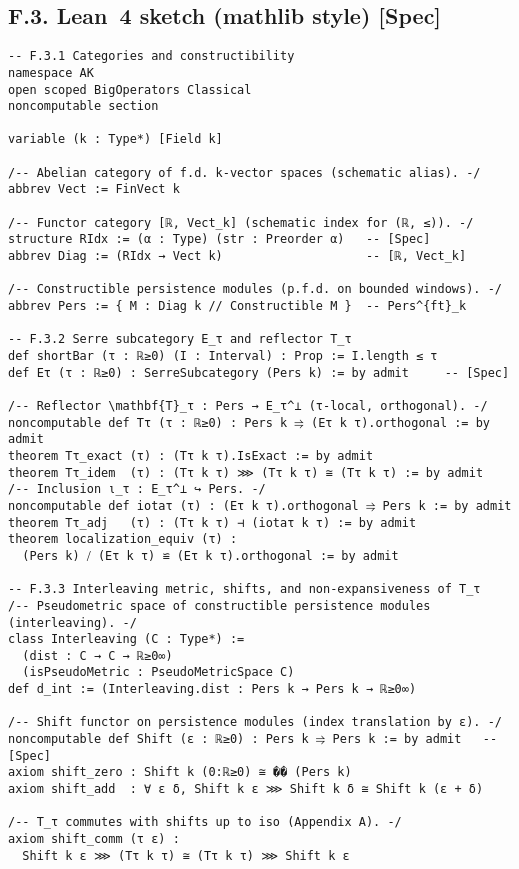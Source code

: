 \documentclass[11pt]{article}
\numberwithin{equation}{section}
\theoremstyle{definition}
\begin{document}
\subsection*{F.3. Lean~4 sketch (\textsf{mathlib} style) [Spec]}
\begin{verbatim}
-- F.3.1 Categories and constructibility
namespace AK
open scoped BigOperators Classical
noncomputable section

variable (k : Type*) [Field k]

/-- Abelian category of f.d. k-vector spaces (schematic alias). -/
abbrev Vect := FinVect k

/-- Functor category [ℝ, Vect_k] (schematic index for (ℝ, ≤)). -/
structure RIdx := (α : Type) (str : Preorder α)   -- [Spec]
abbrev Diag := (RIdx → Vect k)                    -- [ℝ, Vect_k]

/-- Constructible persistence modules (p.f.d. on bounded windows). -/
abbrev Pers := { M : Diag k // Constructible M }  -- Pers^{ft}_k

-- F.3.2 Serre subcategory E_τ and reflector T_τ
def shortBar (τ : ℝ≥0) (I : Interval) : Prop := I.length ≤ τ
def Eτ (τ : ℝ≥0) : SerreSubcategory (Pers k) := by admit     -- [Spec]

/-- Reflector \mathbf{T}_τ : Pers → E_τ^⊥ (τ-local, orthogonal). -/
noncomputable def Tτ (τ : ℝ≥0) : Pers k ⥤ (Eτ k τ).orthogonal := by admit
theorem Tτ_exact (τ) : (Tτ k τ).IsExact := by admit
theorem Tτ_idem  (τ) : (Tτ k τ) ⋙ (Tτ k τ) ≅ (Tτ k τ) := by admit
/-- Inclusion ι_τ : E_τ^⊥ ↪ Pers. -/
noncomputable def iotaτ (τ) : (Eτ k τ).orthogonal ⥤ Pers k := by admit
theorem Tτ_adj   (τ) : (Tτ k τ) ⊣ (iotaτ k τ) := by admit
theorem localization_equiv (τ) :
  (Pers k) ⧸ (Eτ k τ) ≌ (Eτ k τ).orthogonal := by admit

-- F.3.3 Interleaving metric, shifts, and non-expansiveness of T_τ
/-- Pseudometric space of constructible persistence modules (interleaving). -/
class Interleaving (C : Type*) :=
  (dist : C → C → ℝ≥0∞)
  (isPseudoMetric : PseudoMetricSpace C)
def d_int := (Interleaving.dist : Pers k → Pers k → ℝ≥0∞)

/-- Shift functor on persistence modules (index translation by ε). -/
noncomputable def Shift (ε : ℝ≥0) : Pers k ⥤ Pers k := by admit   -- [Spec]
axiom shift_zero : Shift k (0:ℝ≥0) ≅ �� (Pers k)
axiom shift_add  : ∀ ε δ, Shift k ε ⋙ Shift k δ ≅ Shift k (ε + δ)

/-- T_τ commutes with shifts up to iso (Appendix A). -/
axiom shift_comm (τ ε) :
  Shift k ε ⋙ (Tτ k τ) ≅ (Tτ k τ) ⋙ Shift k ε


\end{verbatim}
\end{document}
